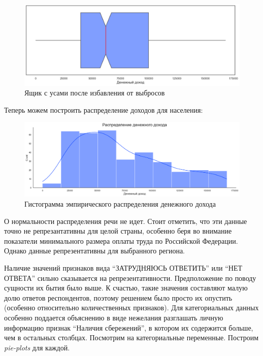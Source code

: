 \documentclass[12pt]{report}
\begin{document}
    \begin{figure}[H]
      \hspace*{2cm}
      \includegraphics[scale=0.3]{title/income_boxplot.png}
       \caption{Ящик с усами после избавления от выбросов}
    \end{figure}
    Теперь можем построить распределение доходов для населения:
    \begin{figure}[H]
      \centering
      \includegraphics[scale=0.5]{title/income.png}
      \caption{Гистограмма эмпирического распределения денежного дохода}
    \end{figure}
    \par
    О нормальности распределения речи не идет. Стоит отметить, что эти данные точно не репрезантативны для целой страны, особенно беря во внимание показатели минимального размера оплаты труда по Российской Федерации. Однако данные репрезентативны для выбранного региона.
    \par
    Наличие значений признаков вида ``ЗАТРУДНЯЮСЬ ОТВЕТИТЬ'' или ``НЕТ ОТВЕТА'' сильно сказывается на репрезентативности. Предположение по поводу сущности их бытия было выше. К счастью, такие значения составляют малую долю ответов респондентов, поэтому решением было просто их опустить (особенно относительно количественных признаков). Для категориальных данных особенно поддается объяснению в виде нежелания разглашать личную информацию признак ``Наличия сбережений'', в котором их содержится больше, чем в остальных столбцах.
    \newpage
    Посмотрим на категориальные переменные. Построим \emph{pie-plots} для каждой.
\end{document}

